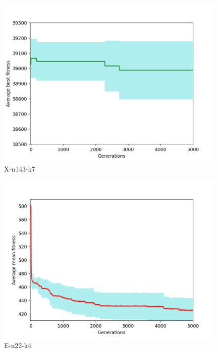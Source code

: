 \documentclass[conference,compsoc]{IEEEtran}
\begin{document}
\begin{figure}[h!]
    \centering
    \includegraphics[scale=0.35]{X-n143-k7}
    \caption{X-n143-k7}
    \label{fig:my_label}
\end{figure}
\newpage

\begin{figure}[h!]
    \centering
    \includegraphics[scale=0.35]{E-n22-k4-mean}
    \caption{E-n22-k4}
    \label{fig:my_label}
\end{figure}
\end{document}
